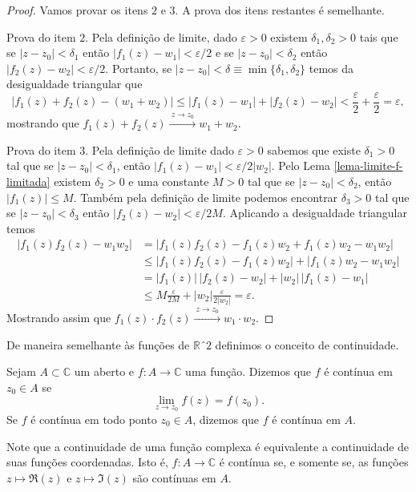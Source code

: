 \begin{proof}
Vamos provar os itens $\mathit{2}$ e $\mathit{3}$. A prova dos itens restantes é semelhante. 

Prova do item $\mathit{2}$. Pela definição de limite, dado $\varepsilon>0$ existem $\delta_1,\delta_2>0$ tais que se $|z-z_0|<\delta_1$
então $|f_1(z)-w_1|<\varepsilon/2$ e se $|z-z_0|<\delta_2$ então $|f_2(z)-w_2|<\varepsilon/2$.
Portanto, se $|z-z_0|<\delta\equiv \min\{\delta_1,\delta_2\}$ temos da desigualdade triangular que  
\[
|f_1(z)+f_2(z) - (w_1+w_2)|\leqslant |f_1(z)-w_1|+|f_2(z)-w_2| <\frac{\varepsilon}{2}+\frac{\varepsilon}{2} = \varepsilon,
\]
mostrando que $f_1(z)+f_2(z)\xrightarrow{\ z\to z_0\ }w_1+w_2$.

Prova do item $\mathit{3}$. Pela definição de limite dado $\varepsilon>0$ sabemos que existe $\delta_1>0$
tal que se $|z-z_0|<\delta_1$, então $|f_1(z)-w_1|<\varepsilon/2|w_2|$. Pelo Lema \ref{lema-limite-f-limitada}
existem $\delta_2>0$ e uma constante $M>0$ tal que se $|z-z_0|<\delta_2$, então $|f_1(z)|\leqslant M$.
Também pela definição de limite podemos encontrar $\delta_3>0$ tal que se $|z-z_0|<\delta_3$ 
então $|f_2(z)-w_2|<\varepsilon/2M$. Aplicando a desigualdade triangular temos
\begin{align*}
|f_1(z)f_2(z) - w_1w_2 | &=  |f_1(z)f_2(z)- f_1(z)w_2+f_1(z)w_2-w_1w_2|
\\
&\leqslant 
|f_1(z)f_2(z)- f_1(z)w_2|+|f_1(z)w_2-w_1w_2|
\\
&=
|f_1(z)|\, |f_2(z)-w_2| + |w_2|\, |f_1(z)-w_1|
\\
&\leqslant
M \frac{\varepsilon}{2M}+|w_2| \frac{\varepsilon}{2|w_2|}
=
\varepsilon.
\end{align*}
Mostrando assim que $f_1(z)\cdot f_2(z)\xrightarrow{\ z\to z_0\ }w_1\cdot w_2$.
\end{proof}

De maneira semelhante às funções de $\mathbb{R}ˆ2$ definimos o conceito de continuidade.  

\begin{definicao}
\label{def-func-complexa-continua}
Sejam $A\subset \mathbb{C}$ um aberto e $f:A\to\mathbb{C}$ uma função. Dizemos que 
$f$ é contínua em $z_0\in A$ se 
\[
\lim_{z\to z_0} f(z) = f(z_0).
\]
Se $f$ é contínua em todo ponto $z_0\in A$, dizemos que $f$ é contínua em $A$.
\end{definicao}

Note que a continuidade de uma função complexa é equivalente a continuidade de 
suas funções coordenadas. Isto é, $f:A\to\mathbb{C}$ é contínua se, e somente se,
as funções $z\longmapsto \Re(z)$ e $z\longmapsto \Im(z)$ são contínuas em $A$.


